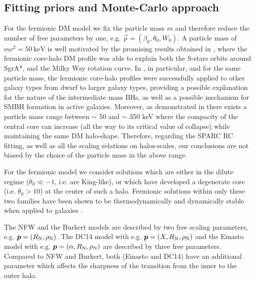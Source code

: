 \subsection{Fitting priors and Monte-Carlo approach}
\label{boundaryC}

For the fermionic DM model we fix the particle mass $m$ and therefore reduce the number of free parameters by one, e.g. $\vec p = (\beta_0, \theta_0, W_0)$. A particle mass of $mc^2 = \SI{50}{\kilo\eV}$ is well motivated by the promising results obtained in \citet{2018PDU....21...82A,2020A&A...641A..34B,2021MNRAS.505L..64B,2022MNRAS.511L..35A}, where the fermionic core-halo DM profile was able to explain both the S-stars orbits around SgrA*, and the Milky Way rotation curve. In \citet{2019PDU....24..278A,2021MNRAS.502.4227A}, in particular, and for the same particle mass, the fermionic core-halo profiles were successfully applied to other galaxy types from dwarf to larger galaxy types, providing a possible explanation for the nature of the intermediate mass BHs, as well as a possible mechanism for SMBH formation in active galaxies. Moreover, as demonstrated in \citet{2018PDU....21...82A} there exists a particle mass range between $\sim$ 50 and $\sim$ 350 keV where the compacity of the central core can increase (all the way to its critical value of collapse) while maintaining the same DM halo-shape. Therefore, regarding the SPARC RC fitting, as well as all the scaling relations on halos-scales, our conclusions are not biased by the choice of the particle mass in the above range.

For the fermionic model we consider solutions which are either in the dilute regime ($\theta_0 \ll -1$, i.e. are King-like), or which have developed a degenerate core (i.e. $\theta_0 > 10$) at the center of such a halo. Fermionic solutions within only these two families have been shown to be thermodynamically and dynamically stable when applied to galaxies \citep{2021MNRAS.502.4227A}.

The NFW and the Burkert models are described by two free scaling parameters, e.g. $\vec p = (R_{\rm N},\rho_{\rm N})$. The DC14 model with e.g. $\vec p = (X, R_{\rm N}, \rho_{\rm N})$ and the Einasto model with e.g. $\vec p = (\alpha, R_{\rm N}, \rho_{\rm N})$ are described by three free parameters. Compared to NFW and Burkert, both (Einasto and DC14) have an additional parameter which affects the sharpness of the transition from the inner to the outer halo.


